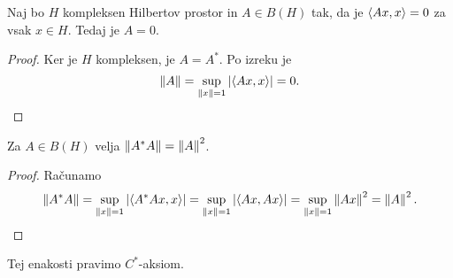 \begin{trditev}
  Naj bo $H$ kompleksen Hilbertov prostor in $A \in B(H)$ tak, da je $\left< Ax,x \right>
  = 0$ za vsak $x \in H$.
  Tedaj je $A = 0$.
\end{trditev}

\begin{proof}
  Ker je $H$ kompleksen, je $A = A^*$.
  Po izreku je
  \[
	\left\lVert A\right\rVert = \sup_{\left\lVert x\right\rVert = 1} \left| \left< Ax,x \right> \right| = 0.
	\qedhere
  \]
\end{proof}

\begin{izrek}
  Za $A \in B(H)$ velja $\left\lVert A^* A\right\rVert = \left\lVert A\right\rVert^2$.
\end{izrek}

\begin{proof}
  Računamo
  \[
	\left\lVert A^* A\right\rVert
	= \sup_{\left\lVert x\right\rVert = 1} \left| \left< A^* Ax, x \right> \right|
	= \sup_{\left\lVert x\right\rVert = 1} \left| \left< Ax, Ax \right> \right|
	= \sup_{\left\lVert x\right\rVert = 1} \left\lVert Ax\right\rVert^2
	= \left\lVert A\right\rVert^2.
	\qedhere
  \]
\end{proof}

\begin{opomba}
  Tej enakosti pravimo $C^*$-aksiom.
\end{opomba}

